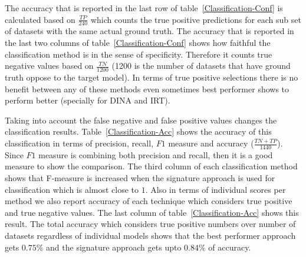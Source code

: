 The accuracy that is reported in the last row of table~\ref{Classification-Conf} is calculated based on $\frac{TP}{240}$ which counts the true positive predictions for each sub set of datasets with the same actual ground truth. The accuracy that is reported in the last two columns of table~\ref{Classification-Conf} shows how faithful the classification method is in the sense of specificity. Therefore it counts true negative values based on $\frac{TN}{1200}$ (1200 is the number of datasets that have ground truth oppose to the target model). In terms of true positive selections there is no benefit between any of these methods even sometimes best performer shows to perform better (specially for DINA and IRT).

Taking into account the false negative and false positive values changes the classification results. Table~\ref{Classification-Acc} shows the accuracy of this classification in terms of precision, recall, $F1$ measure and accuracy ($\frac{TN+TP}{1440}$). Since $F1$ measure is combining both precision and recall, then it is a good measure to show the comparison. The third column of each classification method shows that F-measure is increased when the signature approach is used for classification which is almost close to $1$. Also in terms of individual scores per method we also report accuracy of each technique which considers true positive and true negative values. The last column of table~\ref{Classification-Acc} shows this result. The total accuracy which considers true positive numbers over number of datasets regardless of individual models shows that the best performer approach gets $0.75\%$ and the signature approach gets upto $0.84\%$ of accuracy.


